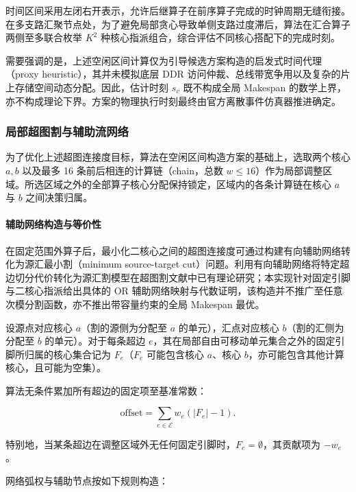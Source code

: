 \documentclass[anonymous,withtoc]{gmcm2026}
\begin{document}
时间区间采用左闭右开表示，允许后继算子在前序算子完成的时钟周期无缝衔接。在多支路汇聚节点处，为了避免局部贪心导致单侧支路过度滞后，算法在汇合算子两侧至多联合枚举 \(K^2\) 种核心指派组合，综合评估不同核心搭配下的完成时刻。

需要强调的是，上述空闲区间计算仅为引导候选方案构造的启发式时间代理（proxy heuristic），其并未模拟底层 DDR 访问仲裁、总线带宽争用以及复杂的片上存储空间动态分配。因此，估计时刻 \(s_v\) 既不构成全局 Makespan 的数学上界，亦不构成理论下界。方案的物理执行时刻最终由官方离散事件仿真器推进确定。

\subsubsection{局部超图割与辅助流网络}

为了优化上述超图连接度目标，算法在空闲区间构造方案的基础上，选取两个核心 \(a, b\) 以及最多 16 条前后相连的计算链（chain，总数 \(w \le 16\)）作为局部调整区域。所选区域之外的全部算子核心分配保持锁定，区域内的各条计算链在核心 \(a\) 与 \(b\) 之间决策归属。

\paragraph{辅助网络构造与等价性}

在固定范围外算子后，最小化二核心之间的超图连接度可通过构建有向辅助网络转化为源汇最小割（minimum source-target cut）问题。利用有向辅助网络将特定超边切分代价转化为源汇割模型在超图割文献中已有理论研究\cite{ref8}；本实现针对固定引脚与二核心指派给出具体的 OR 辅助网络映射与代数证明，该构造并不推广至任意次模分割函数，亦不推出带容量约束的全局 Makespan 最优。

设源点对应核心 \(a\)（割的源侧为分配至 \(a\) 的单元），汇点对应核心 \(b\)（割的汇侧为分配至 \(b\) 的单元）。对于每条超边 \(e\)，其在局部自由可移动单元集合之外的固定引脚所归属的核心集合记为 \(F_e\)（\(F_e\) 可能包含核心 \(a\)、核心 \(b\)，亦可能包含其他计算核心，且可能为空集）。

算法无条件累加所有超边的固定项至基准常数：

\begin{equation}
\text{offset} = \sum_{e \in \mathcal{E}} w_e (|F_e| - 1).
\end{equation}

特别地，当某条超边在调整区域外无任何固定引脚时，\(F_e = \emptyset\)，其贡献项为 \(-w_e\)。

网络弧权与辅助节点按如下规则构造：
\end{document}
